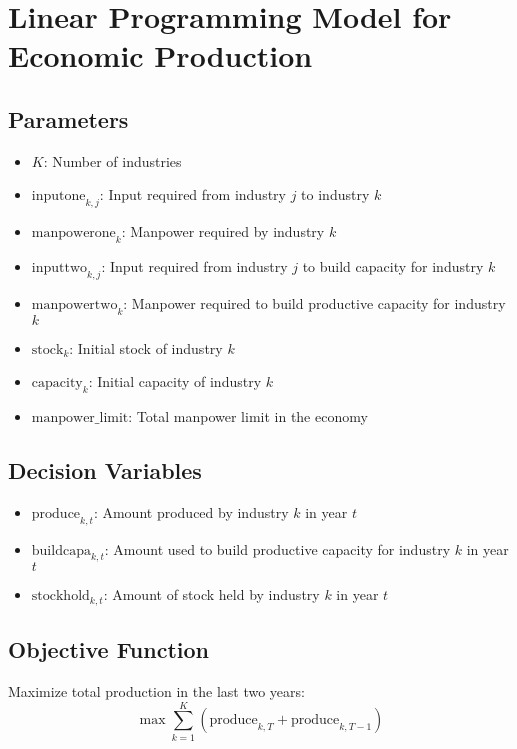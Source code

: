 \documentclass{article}
\begin{document}
\section*{Linear Programming Model for Economic Production}

\subsection*{Parameters}
\begin{itemize}
    \item \( K \): Number of industries
    \item \( \text{inputone}_{k, j} \): Input required from industry \( j \) to industry \( k \)
    \item \( \text{manpowerone}_{k} \): Manpower required by industry \( k \)
    \item \( \text{inputtwo}_{k, j} \): Input required from industry \( j \) to build capacity for industry \( k \)
    \item \( \text{manpowertwo}_{k} \): Manpower required to build productive capacity for industry \( k \)
    \item \( \text{stock}_{k} \): Initial stock of industry \( k \)
    \item \( \text{capacity}_{k} \): Initial capacity of industry \( k \)
    \item \( \text{manpower\_limit} \): Total manpower limit in the economy
\end{itemize}

\subsection*{Decision Variables}
\begin{itemize}
    \item \( \text{produce}_{k, t} \): Amount produced by industry \( k \) in year \( t \)
    \item \( \text{buildcapa}_{k, t} \): Amount used to build productive capacity for industry \( k \) in year \( t \)
    \item \( \text{stockhold}_{k, t} \): Amount of stock held by industry \( k \) in year \( t \)
\end{itemize}

\subsection*{Objective Function}
Maximize total production in the last two years:
\[
\max \sum_{k=1}^{K} (\text{produce}_{k, T} + \text{produce}_{k, T-1})
\]
\end{document}
